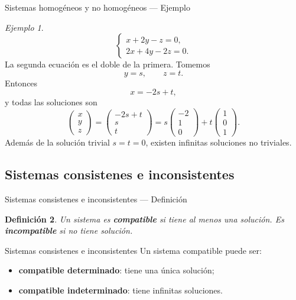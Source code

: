 \documentclass[aspectratio=169,11pt]{beamer}
\newtheorem{definicion}{Definición}[section]
\theoremstyle{remark}
\newtheorem{ejemplo}[definicion]{Ejemplo}
\begin{document}
\begin{frame}[shrink=5]{Sistemas homogéneos y no homogéneos — Ejemplo}
\footnotesize
\begin{ejemplo}
\[
\begin{cases}
x+2y-z=0,\\
2x+4y-2z=0.
\end{cases}
\]
La segunda ecuación es el doble de la primera. Tomemos
\[
y=s,\qquad z=t.
\]
Entonces
\[
x=-2s+t,
\]
y todas las soluciones son
\[
\begin{pmatrix}x\\y\\z\end{pmatrix}
=
\begin{pmatrix}-2s+t\\s\\t\end{pmatrix}
=
s\begin{pmatrix}-2\\1\\0\end{pmatrix}
+t\begin{pmatrix}1\\0\\1\end{pmatrix}.
\]
Además de la solución trivial $s=t=0$, existen infinitas soluciones no triviales.
\end{ejemplo}
\end{frame}

\subsection*{Sistemas consistenes e inconsistentes}
\begin{frame}[shrink=5]{Sistemas consistenes e inconsistentes — Definición}
\footnotesize
\begin{definicion}
Un sistema es \textbf{compatible} si tiene al menos una solución. Es \textbf{incompatible} si no tiene solución.
\end{definicion}
\end{frame}

\begin{frame}[allowframebreaks]{Sistemas consistenes e inconsistentes}
\footnotesize
Un sistema compatible puede ser:
\begin{itemize}
\item \textbf{compatible determinado}: tiene una única solución;
\item \textbf{compatible indeterminado}: tiene infinitas soluciones.
\end{itemize}

\end{frame}
\end{document}
